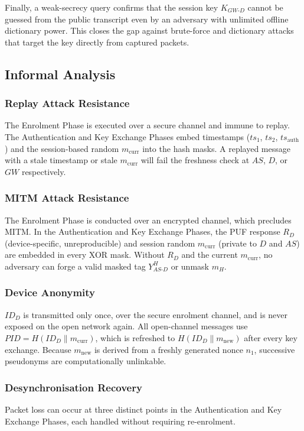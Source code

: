 \documentclass[conference]{IEEEtran}
\begin{document}
Finally, a weak-secrecy query confirms that the session key $K_{GW\text{-}D}$
cannot be guessed from the public transcript even by an adversary with
unlimited offline dictionary power.  This closes the gap against brute-force
and dictionary attacks that target the key directly from captured packets.

\subsection{Informal Analysis}

\subsubsection{Replay Attack Resistance}
The Enrolment Phase is executed over a secure channel and immune to replay.
The Authentication and Key Exchange Phases embed timestamps
($ts_1$, $ts_2$, $ts_{\mathrm{auth}}$) and the session-based random
$m_{\mathrm{curr}}$ into the hash masks.  A replayed message with a stale
timestamp or stale $m_{\mathrm{curr}}$ will fail the freshness check at
$AS$, $D$, or $GW$ respectively.

\subsubsection{MITM Attack Resistance}
The Enrolment Phase is conducted over an encrypted channel, which precludes
MITM.  In the Authentication and Key Exchange Phases, the PUF response $R_D$ (device-specific, unreproducible) and
session random $m_{\mathrm{curr}}$ (private to $D$ and $AS$) are embedded in
every XOR mask.  Without $R_D$ and the current $m_{\mathrm{curr}}$, no
adversary can forge a valid masked tag $Y_{AS\text{-}D}^H$ or unmask $m_H$.

\subsubsection{Device Anonymity}
$ID_D$ is transmitted only once, over the secure enrolment channel, and is
never exposed on the open network again.  All open-channel messages use
$\mathit{PID} = H(ID_D \| m_{\mathrm{curr}})$, which is refreshed to
$H(ID_D \| m_{\mathrm{new}})$ after every key exchange.  Because $m_{\mathrm{new}}$
is derived from a freshly generated nonce $n_1$, successive pseudonyms are
computationally unlinkable.

\subsubsection{Desynchronisation Recovery}
Packet loss can occur at three distinct points in the Authentication and Key Exchange Phases, each
handled without requiring re-enrolment.
\end{document}
